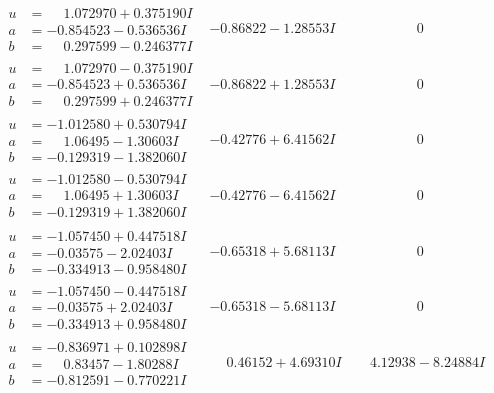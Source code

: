 \documentclass[1p]{elsarticle_modified}
\theoremstyle{definition}
\begin{document}
$$\begin{array}{c|c|c}
\begin{aligned}
u &= \phantom{-}1.072970 + 0.375190 I \\
a &= -0.854523 - 0.536536 I \\
b &= \phantom{-}0.297599 - 0.246377 I\end{aligned}
 & -0.86822 - 1.28553 I & \phantom{-0.000000 } 0 \\ \hline\begin{aligned}
u &= \phantom{-}1.072970 - 0.375190 I \\
a &= -0.854523 + 0.536536 I \\
b &= \phantom{-}0.297599 + 0.246377 I\end{aligned}
 & -0.86822 + 1.28553 I & \phantom{-0.000000 } 0 \\ \hline\begin{aligned}
u &= -1.012580 + 0.530794 I \\
a &= \phantom{-}1.06495 - 1.30603 I \\
b &= -0.129319 - 1.382060 I\end{aligned}
 & -0.42776 + 6.41562 I & \phantom{-0.000000 } 0 \\ \hline\begin{aligned}
u &= -1.012580 - 0.530794 I \\
a &= \phantom{-}1.06495 + 1.30603 I \\
b &= -0.129319 + 1.382060 I\end{aligned}
 & -0.42776 - 6.41562 I & \phantom{-0.000000 } 0 \\ \hline\begin{aligned}
u &= -1.057450 + 0.447518 I \\
a &= -0.03575 - 2.02403 I \\
b &= -0.334913 - 0.958480 I\end{aligned}
 & -0.65318 + 5.68113 I & \phantom{-0.000000 } 0 \\ \hline\begin{aligned}
u &= -1.057450 - 0.447518 I \\
a &= -0.03575 + 2.02403 I \\
b &= -0.334913 + 0.958480 I\end{aligned}
 & -0.65318 - 5.68113 I & \phantom{-0.000000 } 0 \\ \hline\begin{aligned}
u &= -0.836971 + 0.102898 I \\
a &= \phantom{-}0.83457 - 1.80288 I \\
b &= -0.812591 - 0.770221 I\end{aligned}
 & \phantom{-}0.46152 + 4.69310 I & \phantom{-}4.12938 - 8.24884 I \\ \hline\begin{aligned}

\end{aligned}
\end{array}$$
\end{document}
